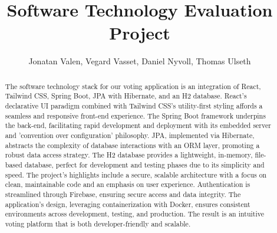 \documentclass[11pt]{article}
\begin{document}
\title{Software Technology Evaluation Project}

\author{Jonatan Valen, Vegard Vasset, Daniel Nyvoll, Thomas Ulseth}

\maketitle

\begin{abstract}
The software technology stack for our voting application is an integration of React, Tailwind CSS, Spring Boot, JPA with Hibernate, and an H2 database. React's declarative UI paradigm combined with Tailwind CSS's utility-first styling affords a seamless and responsive front-end experience. The Spring Boot framework underpins the back-end, facilitating rapid development and deployment with its embedded server and 'convention over configuration' philosophy. JPA, implemented via Hibernate, abstracts the complexity of database interactions with an ORM layer, promoting a robust data access strategy. The H2 database provides a lightweight, in-memory, file-based database, perfect for development and testing phases due to its simplicity and speed. The project's highlights include a secure, scalable architecture with a focus on clean, maintainable code and an emphasis on user experience. Authentication is streamlined through Firebase, ensuring secure access and data integrity. The application's design, leveraging containerization with Docker, ensures consistent environments across development, testing, and production. The result is an intuitive voting platform that is both developer-friendly and scalable.
\end{abstract}

%














{}
\end{document}
